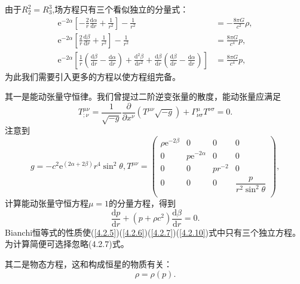 \documentclass[11pt, a4paper, oneside, onecolumn]{ctexart}
\numberwithin{equation}{subsection}
\begin{document}
由于$R^{2}_{2}=R^{3}_{3}$,场方程只有三个看似独立的分量式：
\begin{align}
\mathrm{e}^{-2\alpha}\left[-\frac{2}{r}\frac{\mathrm{d}\alpha}{\mathrm{d}r}+\frac{1}{r^{2}}\right]-\frac{1}{r^{2}}&=-\frac{8\pi G}{c^{2}}\rho,\label{4.2.5}\\
\mathrm{e}^{-2\alpha}\left[\frac{2}{r}\frac{\mathrm{d}\beta}{\mathrm{d}r}+\frac{1}{r^{2}}\right]-\frac{1}{r^{2}}&=\frac{8\pi G}{c^{4}}p,\label{4.2.6}\\
\mathrm{e}^{-2\alpha}\left[\frac{1}{r}\left(\frac{\mathrm{d}\beta}{\mathrm{d}r}-\frac{\mathrm{d}\alpha}{\mathrm{d}r}\right)+\frac{\mathrm{d}^{2}\beta}{\mathrm{d}r^{2}}+\frac{\mathrm{d}\beta}{\mathrm{d}r}\left(\frac{\mathrm{d}\beta}{\mathrm{d}r}-\frac{\mathrm{d}\alpha}{\mathrm{d}r}\right)\right]&=\frac{8\pi G}{c^{4}}p,\label{4.2.7}
\end{align}
为此我们需要引入更多的方程以使方程组完备。

其一是能动张量守恒律。我们曾提过二阶逆变张量的散度，能动张量应满足
\begin{equation}
T^{\mu\nu}_{;\nu}=\frac{1}{\sqrt{-g}}\frac{\partial{}}{\partial{}x^{\nu}}\left(T^{\mu\nu}\sqrt{-g}\right)+\Gamma^{\mu}_{\nu\sigma}T^{\nu\sigma}=0.
\end{equation}
注意到
\begin{equation}
g=-c^{2}\mathrm{e}^{\left(2\alpha+2\beta\right)}r^{4}\sin^{2}\theta,T^{\mu\nu}=
\begin{pmatrix}
\rho \mathrm{e}^{-2\beta} & 0 & 0 & 0\\
0 & p\mathrm{e}^{-2\alpha} & 0 & 0\\
0 & 0 & pr^{-2} & 0\\
0 & 0 & 0 & \dfrac{p}{r^{2}\sin^{2}\theta}\\
\end{pmatrix},
\end{equation}
计算能动张量守恒方程$\mu=1$的分量方程，得到
\begin{equation}
\frac{\mathrm{d}p}{\mathrm{d}r}+\left(p+\rho c^{2}\right)\frac{\mathrm{d}\beta}{\mathrm{d}r}=0.\label{4.2.10}
\end{equation}
Bianchi恒等式的性质使(\ref{4.2.5})(\ref{4.2.6})(\ref{4.2.7})(\ref{4.2.10})式中只有三个独立方程。为计算简便可选择忽略(4.2.7)式。

其二是物态方程，这和构成恒星的物质有关：
\begin{equation}
\rho=\rho\left(p\right).
\end{equation}
\end{document}
